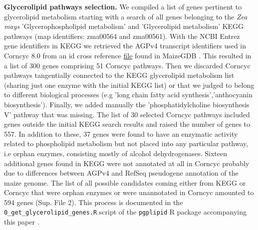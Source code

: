 \documentclass[9pt,twocolumn,twoside,lineno]{BioRxiv}
\begin{document}
\textbf{Glycerolipid pathways selection.}
We compiled a list of genes pertinent to glycerolipid metabolism starting with a search of all genes belonging to the \textit{Zea mays} 'Glycerophospholipid metabolism' and 'Glycerolipid metabolism' KEGG pathways \cite{kanehisa2019} (map identifiers: zma00564 and zma00561). 
With the NCBI Entrez gene identifiers in KEGG we retrieved the AGPv4 transcript identifiers used in Corncyc 8.0 \cite{portwood2019, walsh2016} from an id cross reference \href{https://www.maizegdb.org/search/gene/download_gene_xrefs.php?relative=v4}{file} found in MaizeGDB   \cite{portwood2019}.
This resulted in a list of 300 genes comprising 51 Corncyc pathways. 
Then we discarded Corncyc pathways  tangentially connected to the KEGG glycerolipid metabolism list (sharing just one enzyme with the initial KEGG list) or that we judged to belong to different biological processes (e.g 'long chain fatty acid synthesis','anthocyanin biosynthesis'). 
Finally, we added manually the 'phosphatidylcholine biosynthesis V' pathway that was missing. 
The list of 30 selected Corncyc pathways included genes outside the initial KEGG search results and raised the number of genes to 557. 
In addition to these, 37 genes were found to have an enzymatic activity related to phospholipid metabolism but not placed into any particular pathway, i.e orphan enzymes, consisting mostly of alcohol dehydrogenases. 
Sixteen additional genes found in KEGG were not annotated at all in Corncyc probably due to differences between AGPv4 and RefSeq pseudogene annotation of the maize genome. 
The list of all possible candidates coming either from KEGG or Corncyc that were orphan enzymes or were unannotated in Corncyc amounted to 594 genes (Sup. File 2). 
This process is documented in the \verb|0_get_glycerolipid_genes.R| script of the \verb|pgplipid| R package accompanying this paper \cite{fausto_rodriguez_zapata_2020_4323410}.
\end{document}
